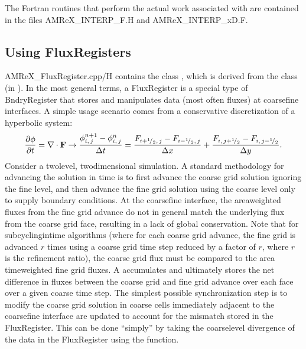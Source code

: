 \documentclass[letterpaper,10pt,english]{sphinxmanual}
\begin{document}
\sphinxAtStartPar
The Fortran routines that perform the actual work associated with  are
contained in the files AMReX\_INTERP\_F.H and AMReX\_INTERP\_xD.F.


\subsection{Using FluxRegisters}
\label{\detokenize{AmrCore:using-fluxregisters}}\label{\detokenize{AmrCore:sec-amrcore-fluxreg}}
\sphinxAtStartPar
AMReX\_FluxRegister.cpp/H contains the class , which is
derived from the class  (in ).
In the most general terms, a FluxRegister is a special type of BndryRegister
that stores and manipulates data (most often fluxes) at coarse\sphinxhyphen{}fine interfaces.
A simple usage scenario comes from a conservative discretization of a hyperbolic
system:
\begin{equation*}
\begin{split}\frac{\partial\phi}{\partial t} = \nabla\cdot{\bf F}
\rightarrow
\frac{\phi_{i,\,j}^{n+1}-\phi_{i,\,j}^n}{\Delta t} = \frac{F_{i+^1\!/_2,\,j}-F_{i-^1\!/_2,\,j}}{\Delta x} + \frac{F_{i,\,j+^1\!/_2} - F_{i,\,j-^1\!/_2}}{\Delta y}.\end{split}
\end{equation*}
\sphinxAtStartPar
Consider a two\sphinxhyphen{}level, two\sphinxhyphen{}dimensional simulation. A standard methodology for
advancing the solution in time is to first advance the coarse grid solution
ignoring the fine level, and then advance the fine grid solution using the
coarse level only to supply boundary conditions. At the coarse\sphinxhyphen{}fine interface,
the area\sphinxhyphen{}weighted fluxes from the fine grid advance do not in general match the
underlying flux from the coarse grid face, resulting in a lack of global
conservation. Note that for subcycling\sphinxhyphen{}in\sphinxhyphen{}time algorithms (where for each coarse
grid advance, the fine grid is advanced \(r\) times using a coarse grid time
step reduced by a factor of \(r\), where \(r\) is the refinement ratio),
the coarse grid flux must be compared to the area  time\sphinxhyphen{}weighted fine grid
fluxes. A  accumulates and ultimately stores the net
difference in fluxes between the coarse grid and fine grid advance over each
face over a given coarse time step. The simplest possible synchronization step
is to modify the coarse grid solution in coarse cells immediately adjacent to
the coarse\sphinxhyphen{}fine interface are updated to account for the mismatch stored in the
FluxRegister. This can be done “simply” by taking the coarse\sphinxhyphen{}level divergence of
the data in the FluxRegister using the  function.
\end{document}
